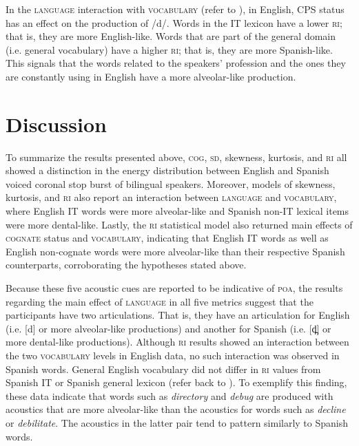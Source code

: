 \documentclass[output=paper,colorlinks,citecolor=brown,
]{langscibook}
\begin{document}
In the \textsc{language} interaction with \textsc{vocabulary} (refer to ), in English, CPS status has an effect on the production of /d/. Words in the IT lexicon  have a lower \textsc{ri}; that is, they are more English-like. Words that are part of the general domain (i.e. general vocabulary) have a higher \textsc{ri}; that is, they are more Spanish-like. This signals that the words related to the speakers' profession and the ones they are constantly using in English have a more alveolar-like production.

\section{Discussion}\label{sec:gutierrez:discussion}

To summarize the results presented above, \textsc{cog}, \textsc{sd}, skewness, kurtosis, and \textsc{ri} all showed a distinction in the energy distribution between English and Spanish voiced coronal stop burst of bilingual speakers. Moreover, models of skewness, kurtosis, and \textsc{ri} also report an interaction between \textsc{language} and \textsc{vocabulary}, where English IT words were more alveolar-like and Spanish non-IT lexical items were more dental-like. Lastly, the \textsc{ri} statistical model also returned main effects of \textsc{cognate} status and \textsc{vocabulary}, indicating that English IT words as well as English non-cognate words were more alveolar-like than their respective Spanish counterparts, corroborating the hypotheses stated above.

Because these five acoustic cues are reported to be indicative of \textsc{poa}, the results regarding the main effect of \textsc{language} in all five metrics suggest that the participants have two articulations. That is, they have an articulation for English (i.e. [d] or more alveolar-like productions) and another for Spanish (i.e. [d̪] or more dental-like productions). Although \textsc{ri} results showed an interaction between the two \textsc{vocabulary} levels in English data, no such interaction was observed in Spanish words. General English vocabulary did not differ in \textsc{ri} values from Spanish IT or Spanish general lexicon (refer back to ). To exemplify this finding, these data indicate that words such as \textit{directory} and \textit{debug} are produced with acoustics that are more alveolar-like than the acoustics for words such as \textit{decline} or \textit{debilitate}. The acoustics in the latter pair tend to pattern similarly to Spanish words.
\end{document}
